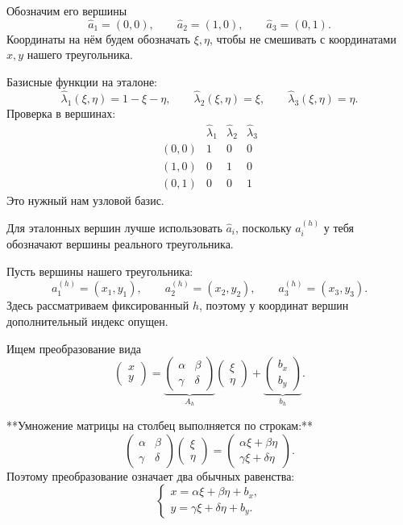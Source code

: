\documentclass[a4paper,14pt]{extarticle}
\begin{document}
	
	

	
	Обозначим его вершины
	\[
	\widehat a_1=(0,0),\qquad
	\widehat a_2=(1,0),\qquad
	\widehat a_3=(0,1).
	\]
	Координаты на нём будем обозначать \(\xi,\eta\), чтобы не смешивать с координатами \(x,y\) нашего треугольника.
	
	Базисные функции на эталоне:
	\[
	\widehat\lambda_1(\xi,\eta)=1-\xi-\eta,\qquad
	\widehat\lambda_2(\xi,\eta)=\xi,\qquad
	\widehat\lambda_3(\xi,\eta)=\eta.
	\]
	Проверка в вершинах:
	\[
	\begin{array}{c|ccc}
		&\widehat\lambda_1&\widehat\lambda_2&\widehat\lambda_3\\ \hline
		(0,0)&1&0&0\\
		(1,0)&0&1&0\\
		(0,1)&0&0&1
	\end{array}
	\]
	Это нужный нам узловой базис.
	
	Для эталонных вершин лучше использовать \(\widehat a_i\), поскольку \(a_i^{(h)}\) у тебя обозначают вершины реального треугольника.
	

	
	Пусть вершины нашего треугольника:
	\[
	a_1^{(h)}=(x_1,y_1),\qquad
	a_2^{(h)}=(x_2,y_2),\qquad
	a_3^{(h)}=(x_3,y_3).
	\]
	Здесь рассматриваем фиксированный \(h\), поэтому у координат вершин дополнительный индекс опущен.
	
	Ищем преобразование вида
	\[
	\begin{pmatrix}x\\y\end{pmatrix}
	=
	\underbrace{\begin{pmatrix}
			\alpha&\beta\\
			\gamma&\delta
	\end{pmatrix}}_{A_h}
	\begin{pmatrix}\xi\\\eta\end{pmatrix}
	+
	\underbrace{\begin{pmatrix}b_x\\b_y\end{pmatrix}}_{b_h}.
	\]
	
	**Умножение матрицы на столбец выполняется по строкам:**
	\[
	\begin{pmatrix}
		\alpha&\beta\\
		\gamma&\delta
	\end{pmatrix}
	\begin{pmatrix}\xi\\\eta\end{pmatrix}
	=
	\begin{pmatrix}
		\alpha\xi+\beta\eta\\
		\gamma\xi+\delta\eta
	\end{pmatrix}.
	\]
	Поэтому преобразование означает два обычных равенства:
	\[
	\begin{cases}
		x=\alpha\xi+\beta\eta+b_x,\\
		y=\gamma\xi+\delta\eta+b_y.
	\end{cases}
	\]
	
\end{document}

